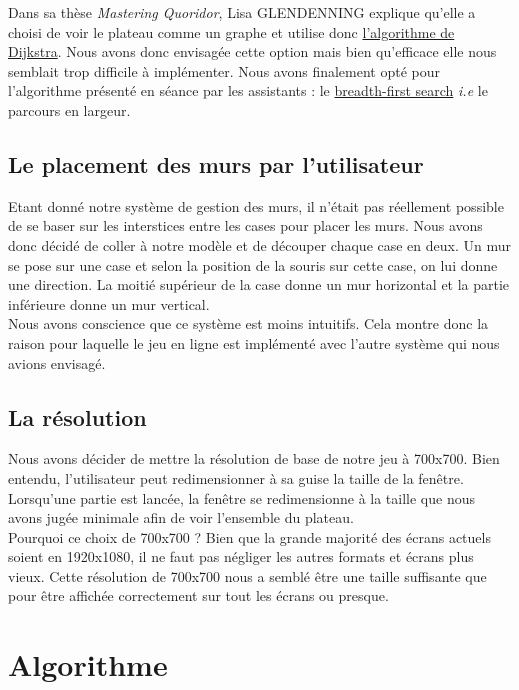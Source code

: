 \documentclass[a4paper, 12pt]{article}
\begin{document}
Dans sa thèse \textit{Mastering Quoridor}, Lisa GLENDENNING explique qu'elle a choisi de voir le plateau comme un graphe et utilise donc \href{https://en.wikipedia.org/wiki/Dijkstra_algorithm}{l'algorithme de Dijkstra}. Nous avons donc envisagée cette option mais bien qu'efficace elle nous semblait trop difficile à implémenter. Nous avons finalement opté pour l'algorithme présenté en séance par les assistants : le \href{https://en.wikipedia.org/wiki/Breadth-first_search}{breadth-first search} \textit{i.e} le parcours en largeur.

\subsection{Le placement des murs par l'utilisateur}
Etant donné notre système de gestion des murs, il n'était pas réellement possible de se baser sur les interstices entre les cases pour placer les murs. Nous avons donc décidé de coller à notre modèle et de découper chaque case en deux. Un mur se pose sur une case et selon la position de la souris sur cette case, on lui donne une direction. La moitié supérieur de la case donne un mur horizontal et la partie inférieure donne un mur vertical. \\
Nous avons conscience que ce système est moins intuitifs. Cela montre donc la raison pour laquelle le jeu en ligne est implémenté avec l'autre système qui nous avions envisagé.

\subsection{La résolution}
Nous avons décider de mettre la résolution de base de notre jeu à 700x700. Bien entendu, l'utilisateur peut redimensionner à sa guise la taille de la fenêtre. Lorsqu'une partie est lancée, la fenêtre se redimensionne à la taille que nous avons jugée minimale afin de voir l'ensemble du plateau. \\

Pourquoi ce choix de 700x700 ?  Bien que la grande majorité des écrans actuels soient en 1920x1080, il ne faut pas négliger les autres formats et écrans plus vieux. Cette résolution de 700x700 nous a semblé être une taille suffisante que pour être affichée correctement sur tout les écrans ou presque.

\section{Algorithme}
\end{document}
